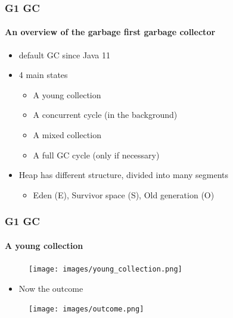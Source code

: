 \documentclass{beamer}
\begin{document}
\begin{frame}
    \frametitle{G1 GC}
    \framesubtitle{An overview of the garbage first garbage collector}
    \begin{itemize}
        \item default GC since Java 11\cite{noauthor_jdk11usrchotspotsharegcg1_nodate}
        \item 4 main states 
        \begin{itemize}
            \item A young collection
            \item A concurrent cycle (in the background)
            \item A mixed collection
            \item A full GC cycle (only if necessary)
        \end{itemize}
        \item Heap has different structure, divided into many segments
        \begin{itemize}
            \item Eden (E), Survivor space (S), Old generation (O)
        \end{itemize}
    \end{itemize}
    
\end{frame}

\begin{frame}
    \frametitle{G1 GC}
    \framesubtitle{A young collection}
    \begin{figure}
        \texttt{[image: images/young\_collection.png]}
    
    \end{figure}
    \begin{itemize}
        \item Now the outcome
    \end{itemize}
    \begin{figure}
        \texttt{[image: images/outcome.png]}
    
    \end{figure}
    
        
    
\end{frame}
\end{document}
